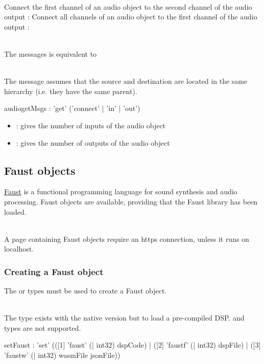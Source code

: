 \documentclass[a4paper,twoside]{article}
\newcommand{\sublevel}[1]	{\subsection{#1}}
\newcommand{\subsublevel}[1]	{\subsubsection{#1}}
\begin{document}
\example\\
Connect the first channel of an audio object to the second channel of the audio output :
Connect all channels of an audio object to the first channel of the audio output :

\note{}\\
The messages  is equivalent to 

\note{}\\
The  message assumes that the source and destination are located in the same hierarchy (i.e. they have the same parent). 

\begin{rail}
audiogetMsgs : 'get' ('connect' | 'in' | 'out')
\end{rail}

\begin{itemize}
\item {}: gives the number of inputs of the audio object
\item {}: gives the number of outputs of the audio object
\end{itemize}

\sublevel{Faust objects}
\label{faustObjects}

\href{https://faust.grame.fr/}{Faust} is a functional programming language for sound synthesis and audio processing.
Faust objects are available, providing that the Faust library has been loaded.

\warning \\
A page containing Faust objects require an https connection, unless it runs on localhost.

\subsublevel{Creating a Faust object}
\label{webFaust}

The  or  types must be used to create a Faust object.

\note{}\\
The  type exists with the native version but to load a pre-compiled DSP.  and  types are not supported.

\begin{rail}
setFaust : 'set' (([1] 'faust' (| int32) dspCode)
				| ([2] 'faustf' (| int32) dspFile)
				| ([3] 'faustw' (| int32) wasmFile jsonFile))

\end{rail}
\end{document}
